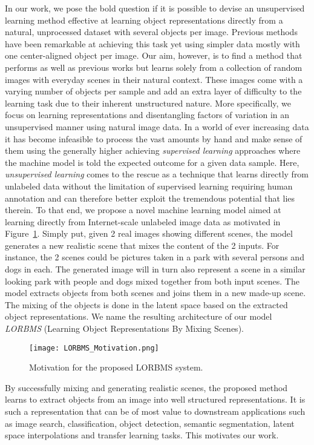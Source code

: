 \documentclass[a4paper,12pt]{report}
\begin{document}
In our work, we pose the bold question if it is possible to devise an unsupervised learning method effective at learning object representations directly from a natural, unprocessed dataset with several objects per image. Previous methods have been remarkable at achieving this task yet using simpler data mostly with one center-aligned object per image. Our aim, however, is to find a method that performs as well as previous works but learns solely from a collection of random images with everyday scenes in their natural context. These images come with a varying number of objects per sample and add an extra layer of difficulty to the learning task due to their inherent unstructured nature. More specifically, we focus on learning representations and disentangling factors of variation in an unsupervised manner using natural image data. In a world of ever increasing data it has become infeasible to process the vast amounts by hand and make sense of them using the generally higher achieving \textit{supervised learning} approaches where the machine model is told the expected outcome for a given data sample. Here, \textit{unsupervised learning} comes to the rescue as a technique that learns directly from unlabeled data without the limitation of supervised learning requiring human annotation and can therefore better exploit the tremendous potential that lies therein. To that end, we propose a novel machine learning model aimed at learning directly from Internet-scale unlabeled image data as motivated in Figure~\ref{fig:idea_lorbms}. Simply put, given 2 real images showing different scenes, the model generates a new realistic scene that mixes the content of the 2 inputs. For instance, the 2 scenes could be pictures taken in a park with several persons and dogs in each. The generated image will in turn also represent a scene in a similar looking park with people and dogs mixed together from both input scenes. The model extracts objects from both scenes and joins them in a new made-up scene. The mixing of the objects is done in the latent space based on the extracted object representations. We name the resulting architecture of our model \textit{LORBMS} (Learning Object Representations By Mixing Scenes).
\begin{figure}[ht]
\centering
\texttt{[image: LORBMS\_Motivation.png]}
\caption{Motivation for the proposed LORBMS system.}
\label{fig:idea_lorbms}
\end{figure}

By successfully mixing and generating realistic scenes, the proposed method learns to extract objects from an image into well structured representations. It is such a representation that can be of most value to downstream applications such as image search, classification, object detection, semantic segmentation, latent space interpolations and transfer learning tasks. This motivates our work.
\end{document}
